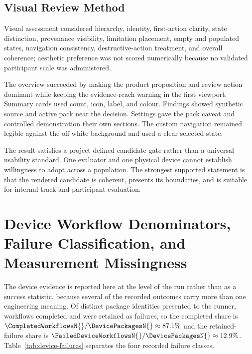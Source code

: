\subsection{Visual Review Method}

Visual assessment considered hierarchy, identity, first-action clarity, state distinction, provenance visibility, limitation placement, empty and populated states, navigation consistency, destructive-action treatment, and overall coherence; aesthetic preference was not scored numerically because no validated participant scale was administered.

The overview succeeded by making the product proposition and review action dominant while keeping the evidence-reach warning in the first viewport. Summary cards used count, icon, label, and colour. Findings showed synthetic source and active pack near the decision. Settings gave the pack caveat and controlled demonstration their own sections. The custom navigation remained legible against the off-white background and used a clear selected state.

The result satisfies a project-defined candidate gate rather than a universal usability standard. One evaluator and one physical device cannot establish willingness to adopt across a population. The strongest supported statement is that the rendered candidate is coherent, presents its boundaries, and is suitable for internal-track and participant evaluation.

\section{Device Workflow Denominators, Failure Classification, and Measurement Missingness}

The device evidence is reported here at the level of the run rather than as a success statistic, because several of the recorded outcomes carry more than one engineering meaning. Of \DevicePackagesN{} distinct package identities presented to the runner, \CompletedWorkflowsN{} workflows completed and \FailedDeviceWorkflowsN{} were retained as failures, so the completed share is $\CompletedWorkflowsN{}/\DevicePackagesN{}\approx87.1\%$ and the retained-failure share is $\FailedDeviceWorkflowsN{}/\DevicePackagesN{}\approx12.9\%$. Table~\ref{tab:device-failures} separates the four recorded failure classes.

